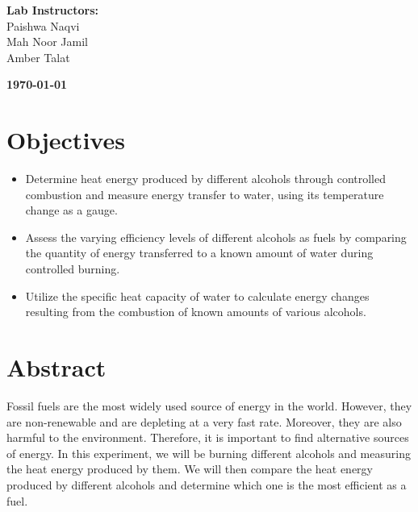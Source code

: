 \documentclass[a4paper, 12pt, english]{article}
\begin{document}
\begin{titlepage}
\begin{center}
		\vspace{45pt}
		\textbf {\large Lab Instructors:}\\[0.2cm]
		\Large {Paishwa Naqvi}\\[0.1cm]
		\Large {Mah Noor Jamil}\\[0.1cm]
		\Large {Amber Talat}\\[0.1cm]
	\end{center}

	\par
	\vfill
	\begin{center}
		\textbf{\today}\\
	\end{center}

\end{titlepage}



\newpage
\section{Objectives}
\begin{itemize}
	\item Determine heat energy produced by different alcohols through controlled
	      combustion and measure energy transfer to water, using its temperature change
	      as a gauge.

	\item Assess the varying efficiency levels of different alcohols as fuels by
	      comparing the quantity of energy transferred to a known amount of water during
	      controlled burning.

	\item Utilize the specific heat capacity of water to calculate energy changes
	      resulting from the combustion of known amounts of various alcohols.
\end{itemize}

\section{Abstract}
Fossil fuels are the most widely used source of energy in the world. However,
they are non-renewable and are depleting at a very fast rate. Moreover, they
are also harmful to the environment. Therefore, it is important to find
alternative sources of energy. In this experiment, we will be burning different
alcohols and measuring the heat energy produced by them. We will then compare
the heat energy produced by different alcohols and determine which one is the
most efficient as a fuel.
\end{document}
